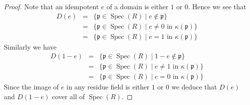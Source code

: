 \documentclass[10pt,a4paper]{amsart}
\theoremstyle{plain}
\theoremstyle{definition}
\theoremstyle{remark}
\numberwithin{equation}{subsection}
\def\Spec{\mathop{\mathrm{Spec}}}
\begin{document}
\begin{proof}
Note that an idempotent $e$ of a domain is either $1$ or $0$.
Hence we see that
\begin{eqnarray*}
D(e)
& = &
\{ \mathfrak p \in \Spec(R)
\mid
e \not\in \mathfrak p \} \\
& = &
\{ \mathfrak p \in \Spec(R)
\mid
e \not = 0\text{ in }\kappa(\mathfrak p) \} \\
& = &
\{ \mathfrak p \in \Spec(R)
\mid
e = 1\text{ in }\kappa(\mathfrak p) \}
\end{eqnarray*}
Similarly we have
\begin{eqnarray*}
D(1-e)
& = &
\{ \mathfrak p \in \Spec(R)
\mid
1 - e \not\in \mathfrak p \} \\
& = &
\{ \mathfrak p \in \Spec(R)
\mid
e \not = 1\text{ in }\kappa(\mathfrak p) \} \\
& = &
\{ \mathfrak p \in \Spec(R)
\mid
e = 0\text{ in }\kappa(\mathfrak p) \}
\end{eqnarray*}
Since the image of $e$ in any residue field is either $1$ or $0$
we deduce that $D(e)$ and $D(1-e)$ cover all of $\Spec(R)$.
\end{proof}
\end{document}
